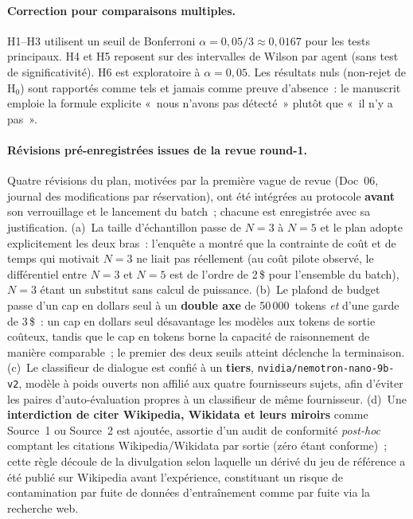 \documentclass[a4paper,11pt]{report}
\begin{document}
\paragraph{Correction pour comparaisons multiples.} H1--H3 utilisent un seuil de Bonferroni $\alpha{=}0{,}05/3 \approx 0{,}0167$ pour les tests principaux. H4 et H5 reposent sur des intervalles de Wilson par agent (sans test de significativité). H6 est exploratoire à $\alpha{=}0{,}05$. Les résultats nuls (non-rejet de $\mathrm{H}_0$) sont rapportés comme tels et jamais comme preuve d'absence~: le manuscrit emploie la formule explicite «~nous n'avons pas détecté~» plutôt que «~il n'y a pas~».

\paragraph{Révisions pré-enregistrées issues de la revue round-1.} Quatre révisions du plan, motivées par la première vague de revue (Doc~06, journal des modifications par réservation), ont été intégrées au protocole \textbf{avant} son verrouillage et le lancement du batch~; chacune est enregistrée avec sa justification. (a)~La taille d'échantillon passe de $N{=}3$ à $N{=}5$ et le plan adopte explicitement les deux bras~: l'enquête a montré que la contrainte de coût et de temps qui motivait $N{=}3$ ne liait pas réellement (au coût pilote observé, le différentiel entre $N{=}3$ et $N{=}5$ est de l'ordre de 2\,\$ pour l'ensemble du batch), $N{=}3$ étant un substitut sans calcul de puissance. (b)~Le plafond de budget passe d'un cap en dollars seul à un \textbf{double axe} de 50\,000~tokens \emph{et} d'une garde de 3\,\$~: un cap en dollars seul désavantage les modèles aux tokens de sortie coûteux, tandis que le cap en tokens borne la capacité de raisonnement de manière comparable~; le premier des deux seuils atteint déclenche la terminaison. (c)~Le classifieur de dialogue est confié à un \textbf{tiers}, \texttt{nvidia/nemotron-nano-9b-v2}, modèle à poids ouverts non affilié aux quatre fournisseurs sujets, afin d'éviter les paires d'auto-évaluation propres à un classifieur de même fournisseur. (d)~Une \textbf{interdiction de citer Wikipedia, Wikidata et leurs miroirs} comme Source~1 ou Source~2 est ajoutée, assortie d'un audit de conformité \emph{post-hoc} comptant les citations Wikipedia/Wikidata par sortie (zéro étant conforme)~; cette règle découle de la divulgation selon laquelle un dérivé du jeu de référence a été publié sur Wikipedia avant l'expérience, constituant un risque de contamination par fuite de données d'entraînement comme par fuite via la recherche web.
\end{document}
